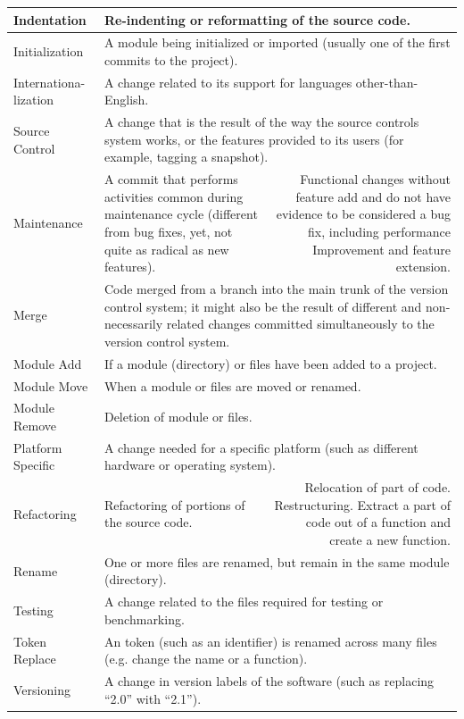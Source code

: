 \begin{table}[htbp]
\begin{tabular}{|p{6em}|p{9em}r|}
    \hline
    Indentation & \multicolumn{2}{p{21.5em}|}{Re-indenting or reformatting of the source code.} \\
    \hline
    Initialization & \multicolumn{2}{p{21.5em}|}{A module being initialized or imported (usually one of the first commits to the project).} \\
    \hline
    Internationa- lization & \multicolumn{2}{p{21.5em}|}{A change related to its support for languages other-than-English.} \\
    \hline
    Source Control & \multicolumn{2}{p{21.5em}|}{A change that is the result of the way the source controls system works, or the features provided to its users (for example, tagging a snapshot).} \\
    \hline
    Maintenance & \multicolumn{1}{p{9em}|}{A commit that performs activities common during maintenance cycle (different from bug fixes, yet, not quite as radical as new features).} & \multicolumn{1}{p{12.5em}|}{Functional changes without feature add and do not have evidence to be considered a bug fix, including performance Improvement and feature extension.} \\
    \hline
    Merge & \multicolumn{2}{p{21.5em}|}{Code merged from a branch into the main trunk of the version control system; it might also be the result of different and non-necessarily related changes committed simultaneously to the version control system.} \\
    \hline
    Module Add & \multicolumn{2}{p{21.5em}|}{If a module (directory) or files have been added to a project.} \\
    \hline
    Module Move & \multicolumn{2}{p{21.5em}|}{When a module or files are moved or renamed.} \\
    \hline
    Module Remove & \multicolumn{2}{p{21.5em}|}{Deletion of module or files.} \\
    \hline
    {Platform Specific} & \multicolumn{2}{p{21.5em}|}{A change needed for a specific platform (such as different hardware or operating system).} \\
    \hline
    Refactoring & \multicolumn{1}{p{9em}|}{Refactoring of portions of the source code.} & \multicolumn{1}{p{12.5em}|}{Relocation of part of code. Restructuring.
    Extract a part of code out of a function and create a new function.} \\
    \hline
    Rename & \multicolumn{2}{p{21.5em}|}{One or more files are renamed, but remain in the same module (directory).} \\
    \hline
    Testing & \multicolumn{2}{p{21.5em}|}{A change related to the files required for testing or benchmarking.} \\
    \hline
    Token Replace & \multicolumn{2}{p{21.5em}|}{An token (such as an identifier) is renamed across many files (e.g. change the name or a function).} \\
    \hline
    Versioning & \multicolumn{2}{p{21.5em}|}{A change in version labels of the software (such as replacing ``2.0'' with ``2.1'').} \\
    \hline
    \end{tabular}%
  \label{tab:categorization}%
\end{table}%

